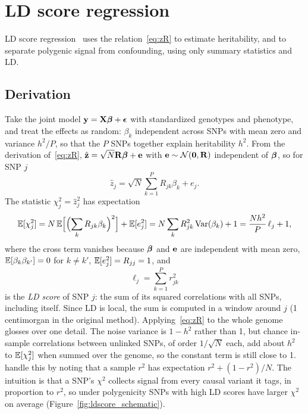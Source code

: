 \section{LD score regression}
\label{sec:ldsc}

LD score regression~\citep{bulik2015} uses the relation~\eqref{eq:zR} to estimate heritability, and to separate polygenic signal from confounding, using only summary statistics and LD.

\subsection{Derivation}

Take the joint model $\mathbf{y}=\mathbf{X}\boldsymbol{\beta}+\boldsymbol{\epsilon}$ with standardized genotypes and phenotype, and treat the effects as random: $\beta_k$ independent across SNPs with mean zero and variance $h^2/P$, so that the $P$ SNPs together explain heritability $h^2$. From the derivation of~\eqref{eq:zR}, $\hat{\mathbf{z}}=\sqrt N\mathbf{R}\boldsymbol{\beta}+\mathbf{e}$ with $\mathbf{e}\sim\mathcal{N}(\mathbf{0},\mathbf{R})$ independent of $\boldsymbol{\beta}$, so for SNP $j$
\begin{equation}
  \hat z_j = \sqrt N\sum_{k=1}^PR_{jk}\beta_k + e_j .
\end{equation}
The statistic $\chi^2_j=\hat z_j^2$ has expectation
\begin{equation}
  \mathbb{E}[\chi^2_j] = N\,\mathbb{E}\Bigl[\Bigl(\sum_kR_{jk}\beta_k\Bigr)^2\Bigr] + \mathbb{E}[e_j^2] = N\sum_kR_{jk}^2\operatorname{Var}(\beta_k) + 1 = \frac{Nh^2}P\,\ell_j + 1,
\end{equation}
where the cross term vanishes because $\boldsymbol{\beta}$ and $\mathbf{e}$ are independent with mean zero, $\mathbb{E}[\beta_k\beta_{k'}]=0$ for $k\neq k'$, $\mathbb{E}[e_j^2]=R_{jj}=1$, and
\begin{equation}
  \ell_j = \sum_{k=1}^P r_{jk}^2
\end{equation}
is the \emph{LD score} of SNP $j$: the sum of its squared correlations with all SNPs, including itself. Since LD is local, the sum is computed in a window around $j$ (1 centimorgan in the original method). Applying~\eqref{eq:zR} to the whole genome glosses over one detail. The noise variance is $1-h^2$ rather than 1, but chance in-sample correlations between unlinked SNPs, of order $1/\sqrt N$ each, add about $h^2$ to $\mathbb{E}[\chi^2_j]$ when summed over the genome, so the constant term is still close to 1. \citet{bulik2015} handle this by noting that a sample $r^2$ has expectation $r^2+(1-r^2)/N$. The intuition is that a SNP's $\chi^2$ collects signal from every causal variant it tags, in proportion to $r^2$, so under polygenicity SNPs with high LD scores have larger $\chi^2$ on average (Figure~\ref{fig:ldscore_schematic}).

